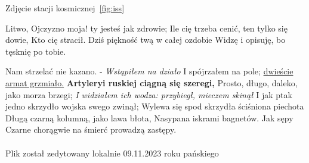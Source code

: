 Zdjęcie stacji kosmicznej~\ref{fig:iss} 



Litwo, Ojczyzno moja! ty jesteś jak zdrowie;
Ile cię trzeba cenić, ten tylko się dowie,
Kto cię stracił. Dziś piękność twą w całej ozdobie
Widzę i opisuję, bo tęsknię po tobie.\par

Nam strzelać nie kazano. - \emph{Wstąpiłem na działo}
I spójrzałem na pole; \underline{dwieście armat grzmiało.}
\textbf{Artyleryi ruskiej ciągną się szeregi,}
Prosto, długo, daleko, jako morza brzegi;
\textit{I widziałem ich wodza: przybiegł, mieczem skinął}
I jak ptak jedno skrzydło wojska swego zwinął;
Wylewa się spod skrzydła ściśniona piechota
Długą czarną kolumną, jako lawa błota,
Nasypana iskrami bagnetów. Jak sępy
Czarne chorągwie na śmierć prowadzą zastępy.
\\
\\
Plik został zedytowany lokalnie 09.11.2023 roku pańskiego